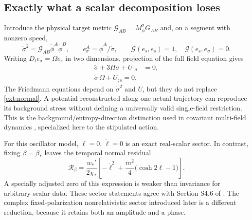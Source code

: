 \documentclass[11pt]{article}
\newcommand{\mf}{M_\phi}
\begin{document}
\subsection{Exactly what a scalar decomposition loses}
Introduce the physical target metric $\mathcal G_{AB}=\mf^2G_{AB}$ and, on a segment with nonzero speed,
\begin{equation}
 \dot\sigma^2=\mathcal G_{AB}\dot\phi^A\dot\phi^B,\qquad
 e_\sigma^A=\dot\phi^A/\dot\sigma,
 \qquad \mathcal G(e_s,e_s)=1,\quad \mathcal G(e_s,e_\sigma)=0.
\end{equation}
Writing $D_te_\sigma=\Omega e_s$ in two dimensions, projection of the full field equation gives
\begin{align}
 \ddot\sigma+3H\dot\sigma+U_{;\sigma}&=0,\label{ext:tangent}\\
 \boxed{\dot\sigma\,\Omega+U_{;s}=0.}\label{ext:normal}
\end{align}
The Friedmann equations depend on $\dot\sigma^2$ and $U$, but they do not replace \eqref{ext:normal}. A potential reconstructed along one actual trajectory can reproduce its background stress without defining a universally valid single-field restriction. This is the background/entropy-direction distinction used in covariant multi-field dynamics \cite{langlois}, specialized here to the stipulated action.

For this oscillator model, $\ell=0$, $\dot\ell=0$ is an exact real-scalar sector. In contrast, fixing $\beta=\beta_*$ leaves the temporal normal residual
\begin{equation}
 \mathcal R_\beta=
 \frac{w_*'}{2\chi_*}\left[-\dot\ell^2+
             \frac{m^2}{4}\bigl(\cosh2\ell-1\bigr)\right].
 \label{ext:frozenres}
\end{equation}
A specially adjusted zero of this expression is weaker than invariance for arbitrary scalar data. These sector statements agree with Section S4.6 of \cite{cubicsupp}. The complex fixed-polarization nonrelativistic sector introduced later is a different reduction, because it retains both an amplitude and a phase.
\end{document}
